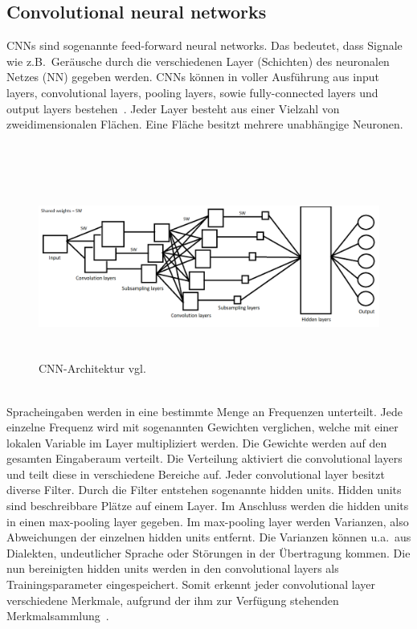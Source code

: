 \subsection{Convolutional neural networks}
CNNs sind sogenannte feed-forward neural networks. Das bedeutet, dass Signale wie z.B.~Geräusche durch die verschiedenen Layer (Schichten) des neuronalen Netzes (NN) gegeben werden. CNNs können in voller Ausführung aus input layers, convolutional layers, pooling layers, sowie fully-connected layers und output layers bestehen~\cite{facialemotionrecusingcnn}. Jeder Layer besteht aus einer Vielzahl von zweidimensionalen Flächen. Eine Fläche besitzt mehrere unabhängige Neuronen.
\\
\\
\\
\begin{figure}[h]
\includegraphics[width=\linewidth, height=6cm]{Bilder/CNN/CNNArchitektur.png}
\caption{CNN-Architektur vgl.~\cite{noisycnn}}
\end{figure}
\\
Spracheingaben werden in eine bestimmte Menge an Frequenzen unterteilt. Jede einzelne Frequenz wird mit sogenannten Gewichten verglichen, welche mit einer lokalen Variable im Layer multipliziert werden. Die Gewichte werden auf den gesamten Eingaberaum verteilt. Die Verteilung aktiviert die convolutional layers und teilt diese in verschiedene Bereiche auf. Jeder convolutional layer besitzt diverse Filter. Durch die Filter entstehen sogenannte hidden units. Hidden units sind beschreibbare Plätze auf einem Layer. Im Anschluss werden die hidden units in einen max-pooling layer gegeben. Im max-pooling layer werden Varianzen, also Abweichungen der einzelnen hidden units entfernt. Die Varianzen können u.a.~aus Dialekten, undeutlicher Sprache oder Störungen in der Übertragung kommen. Die nun bereinigten hidden units werden in den convolutional layers als Trainingsparameter eingespeichert. Somit erkennt jeder convolutional layer verschiedene Merkmale, aufgrund der ihm zur Verfügung stehenden Merkmalsammlung~\cite{usingcnn}.